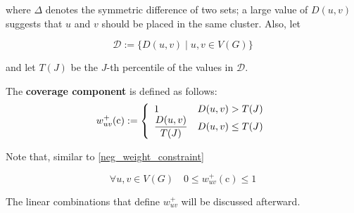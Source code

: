 where $\Delta$ denotes the symmetric difference of two sets; a large value of $D(u, v)$ suggests that $u$ and $v$ should be placed in the same cluster. Also, let

\begin{equation}
    \mathscr{D} := \{D(u, v) \mid u, v \in V(G)\}
\end{equation}

and let $T(J)$ be the $J$-th percentile of the values in $\mathscr{D}$.

\begin{definition} \label{co_comp}
    The \textbf{coverage component} is defined as follows: $$w_{uv}^+(\mathrm c) := \soe{ll}{1 & D(u, v) > T(J) \\ \dfrac{D(u, v)}{T(J)} & D(u, v) \le T(J)}$$
\end{definition}

Note that, similar to \cref{neg_weight_constraint}

\begin{equation}
    \forall u, v \in V(G) \quad 0 \le w_{uv}^+(\mathrm c) \le 1
\end{equation}

The linear combinations that define $w_{uv}^+$ will be discussed afterward.

\cleardoublepage
